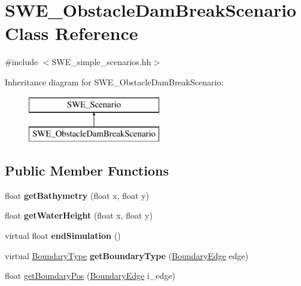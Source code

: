 \hypertarget{classSWE__ObstacleDamBreakScenario}{\section{S\-W\-E\-\_\-\-Obstacle\-Dam\-Break\-Scenario Class Reference}
\label{classSWE__ObstacleDamBreakScenario}
}


{\ttfamily \#include $<$S\-W\-E\-\_\-simple\-\_\-scenarios.\-hh$>$}

Inheritance diagram for S\-W\-E\-\_\-\-Obstacle\-Dam\-Break\-Scenario\-:\begin{figure}[H]
\begin{center}
\leavevmode
\includegraphics[height=2.000000cm]{classSWE__ObstacleDamBreakScenario}
\end{center}
\end{figure}
\subsection*{Public Member Functions}
\begin{DoxyCompactItemize}
\item 
\hypertarget{classSWE__ObstacleDamBreakScenario_adce2da31d424453720a56e16a1bf8858}{float {\bfseries get\-Bathymetry} (float x, float y)}\label{classSWE__ObstacleDamBreakScenario_adce2da31d424453720a56e16a1bf8858}

\item 
\hypertarget{classSWE__ObstacleDamBreakScenario_a4e40b2c498e8eaa7e119d80e55603857}{float {\bfseries get\-Water\-Height} (float x, float y)}\label{classSWE__ObstacleDamBreakScenario_a4e40b2c498e8eaa7e119d80e55603857}

\item 
\hypertarget{classSWE__ObstacleDamBreakScenario_a82cfbbb35d35057e3b8e9f22e894903a}{virtual float {\bfseries end\-Simulation} ()}\label{classSWE__ObstacleDamBreakScenario_a82cfbbb35d35057e3b8e9f22e894903a}

\item 
\hypertarget{classSWE__ObstacleDamBreakScenario_af0eaf65cba688ed9cca1ca8b5847ba94}{virtual \hyperlink{SWE__Scenario_8hh_af75d5dd7322fa39ed0af4e7839e600f8}{Boundary\-Type} {\bfseries get\-Boundary\-Type} (\hyperlink{SWE__Scenario_8hh_aa5e01e3f7df312f7b9b0d02521141fcc}{Boundary\-Edge} edge)}\label{classSWE__ObstacleDamBreakScenario_af0eaf65cba688ed9cca1ca8b5847ba94}

\item 
float \hyperlink{classSWE__ObstacleDamBreakScenario_abb88b0a76f240ec32e26cac962ba403d}{get\-Boundary\-Pos} (\hyperlink{SWE__Scenario_8hh_aa5e01e3f7df312f7b9b0d02521141fcc}{Boundary\-Edge} i\-\_\-edge)
\end{DoxyCompactItemize}
